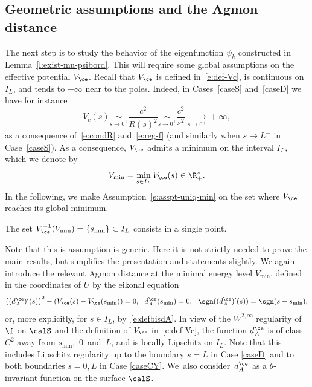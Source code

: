\subsection{Geometric assumptions and the Agmon distance}
The next step is to study the behavior of the eigenfunction $\psi_k$ constructed in Lemma~\ref{l:exist-mu-psibord}. This will require some global assumptions on the effective potential $V_\ce$. Recall that $V_\ce$ is defined in~\eqref{e:def-Vc}, is continuous on $I_L$, and tends to $+\infty$ near to the poles. Indeed, in Cases~\ref{caseS} and~\ref{caseD} we have for instance
\[
V_c(s)\underset{s\to 0^+}\sim\frac{c^2}{R(s)^2}\underset{s\to 0^+}\sim \frac{c^2}{s^2} \underset{s\to 0^+}\to +\infty,
\]
as a consequence of~\eqref{e:condR} and~\eqref{e:reg-f} (and similarly when $s\to L^-$ in Case~\ref{caseS}).
As a consequence, $V_\ce$ admits a minimum on the interval $I_L$, which we denote by
\[
V_{\min} = \min_{s \in I_L} V_\ce(s) \in \R_+^*.
\]
In the following, we make Assumption~\eqref{s:asspt-uniq-min} on the set where $V_\ce$ reaches its global minimum.
\begin{assumption}
\label{a:single-min}
The set $V_{\ce}^{-1}(V_{\min}) = \{s_{\min}\} \subset I_L$ consists in a single point.
\end{assumption}
Note that this is assumption is generic. Here it is not strictly needed to prove the main results, but simplifies the presentation and statements slightly.
We again introduce the relevant Agmon distance at the minimal energy level $V_{\min}$, defined in the coordinates of $U$ by the eikonal equation
\[
\big((d_A^{\ce})'(s) \big)^2-\left( V_\ce(s)- V_\ce(s_{\min}) \right) = 0, \ \ d_A^{\ce}(s_{\min})=0, \ \ \sgn((d_A^{\ce})'(s)) =\sgn(s-s_{\min}),
\]
or, more explicitly, for $s\in I_L$, by~\eqref{e:defbisdA}.
In view of the $W^{2,\infty}$ regularity of $\f$ on $\calS$ and the definition of $V_\ce$ in~\eqref{e:def-Vc}, the function $d_A^{\ce}$ is of class $C^2$ away from $s_{\min}$,~$0$~and~$L$, and is locally Lipschitz on $I_L$. Note that this includes Lipschitz regularity up to the boundary $s=L$ in Case \ref{caseD} and to both boundaries $s=0,L$ in Case \ref{caseCY}.
We~also consider~$d_A^{\ce}$ as a $\theta$-invariant function on the surface $\calS$.

